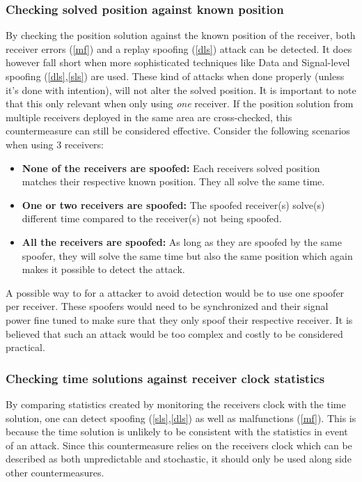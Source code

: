 \documentclass[12pt,english,a4paper]{article}
\begin{document}
\subsubsection{Checking solved position against known position}\label{cspakp} %
By checking the position solution against the known position of the receiver, both receiver errors (\ref{mf}) and a replay spoofing (\ref{dls}) attack can be detected. It does however fall short when more sophisticated techniques like Data and Signal-level spoofing (\ref{dls},\ref{sls}) are used. These kind of attacks when done properly (unless it's done with intention), will not alter the solved position. It is important to note that this only relevant when only using \textit{one} receiver. If the position solution from multiple receivers deployed in the same area are cross-checked, this countermeasure can still be considered effective. Consider the following scenarios when using 3 receivers:
\begin{itemize}
  \item \textbf{None of the receivers are spoofed:} Each receivers solved position matches their respective known position. They all solve the same time. 
  \item \textbf{One or two receivers are spoofed:} The spoofed receiver(s) solve(s) different time compared to the receiver(s) not being spoofed.
  \item \textbf{All the receivers are spoofed:} As long as they are spoofed by the same spoofer, they will solve the same time but also the same position which again makes it possible to detect the attack.
\end{itemize}
A possible way to for a attacker to avoid detection would be to use one spoofer per receiver. These spoofers would need to be synchronized and their signal power fine tuned to make sure that they only spoof their respective receiver. It is believed that such an attack would be too complex and costly to be considered practical. \cite{HengChouGao14}

\subsubsection{Checking time solutions against receiver clock statistics}\label{ctsarcs} %
By comparing statistics created by monitoring the receivers clock with the time solution, one can detect spoofing (\ref{sls},\ref{dls}) as well as malfunctions (\ref{mf}). This is because the time solution is unlikely to be consistent with the statistics in event of an attack. Since this countermeasure relies on the receivers clock which can be described as both unpredictable and stochastic, it should only be used along side other countermeasures.\cite{HengChouGao14}    
\end{document}
